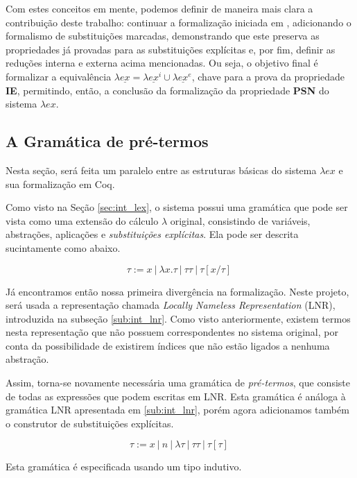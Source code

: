 Com estes conceitos em mente, podemos definir de maneira mais clara a
contribuição deste trabalho: continuar a formalização iniciada em \cite{initial},
adicionando o formalismo de substituições marcadas, demonstrando que este
preserva as propriedades já provadas para as substituições explícitas e, por
fim, definir as reduções interna e externa acima mencionadas. Ou seja, o
objetivo final é formalizar a equivalência $\lambda \underline{ex} = \lambda
\underline{ex}^i \cup \lambda \underline{ex}^e$, chave para a prova da
propriedade \textbf{IE}, permitindo, então, a conclusão da formalização da
propriedade \textbf{PSN} do sistema $\lambda ex$.

\subsection{A Gramática de pré-termos}
\label{sec:termos}

Nesta seção, será feita um paralelo entre as estruturas básicas do sistema
$\lambda ex$ e sua formalização em Coq.

Como visto na Seção \ref{sec:int_lex}, o sistema possui uma gramática que pode
ser vista como uma extensão do cálculo $\lambda$ original, consistindo de
variáveis, abstrações, aplicações e \emph{substituições explícitas}. Ela pode
ser descrita sucintamente como abaixo.

\[ \tau := x\ |\ \lambda x.\tau\ |\ \tau \tau\ |\ \tau[x/\tau]\ \]

Já encontramos então nossa primeira divergência na formalização. Neste projeto,
será usada a representação chamada \textit{Locally Nameless Representation}
(LNR), introduzida na subseção \ref{sub:int_lnr}. Como visto anteriormente,
existem termos nesta representação que não possuem correspondentes no sistema
original, por conta da possibilidade de existirem índices que não estão ligados
a nenhuma abstração.

Assim, torna-se novamente necessária uma gramática de \emph{pré-termos}, que
consiste de todas as expressões que podem escritas em LNR. Esta gramática é
análoga à gramática LNR apresentada em  \ref{sub:int_lnr}, porém agora
adicionamos também o construtor de substituições explícitas.

\[ \tau := x\ |\ n\ |\ \lambda \tau\ |\ \tau \tau\ |\ \tau[\tau]\ \]

Esta gramática é especificada usando um tipo indutivo.

